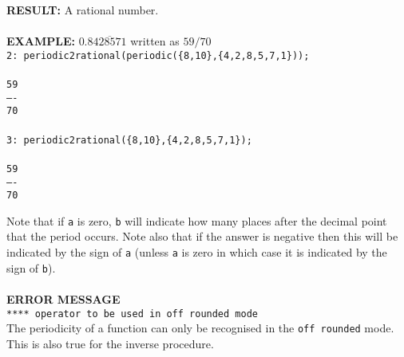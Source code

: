 \begin{tabbing}
{\bf RESULT:}
     \> A rational number.\\ \\

{\bf EXAMPLE:}
    \> $0.8\overline{428571}$ written as $59/70$ \\
    \> {\tt 2: periodic2rational(periodic(\{8,10\},\{4,2,8,5,7,1\}));}
\\ \\
    \> \hspace{1mm} {\tt 59}\\
    \> {\tt ----}\\
    \> \hspace{1mm} {\tt 70}\\ \\
    \> {\tt 3: periodic2rational(\{8,10\},\{4,2,8,5,7,1\});}
\\ \\
    \> \hspace{1mm} {\tt 59}\\
    \> {\tt ----}\\
    \> \hspace{1mm} {\tt 70}
\end{tabbing}

Note that if {\tt a} is zero, {\tt b} will indicate how many places
after the decimal point that the period occurs. Note also that if the answer
is negative then this will be indicated by the sign of {\tt a} (unless
{\tt a} is zero in which case it is indicated by the sign of {\tt b}).
\\ \\


{\bf ERROR MESSAGE}\\

{\tt ***** operator to be used in off rounded mode}\\

The periodicity of a function can only be recognised in
the {\tt off rounded} mode. This is also true for the inverse
procedure.\\ \\





